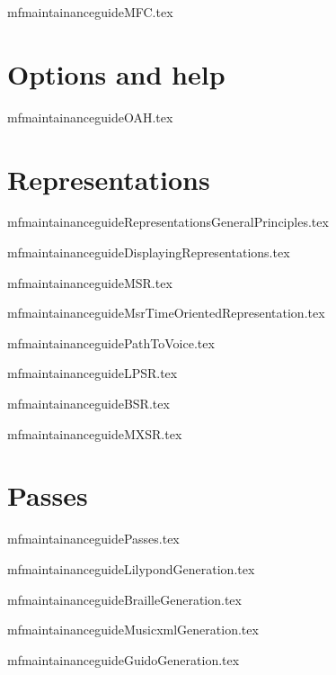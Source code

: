 \documentclass[11pt,a4paper]{report}
\begin{document}
{mfmaintainanceguideMFC.tex}


\part{Options and help}

{mfmaintainanceguideOAH.tex}


\part{Representations}

{mfmaintainanceguideRepresentationsGeneralPrinciples.tex}

{mfmaintainanceguideDisplayingRepresentations.tex}

{mfmaintainanceguideMSR.tex}

{mfmaintainanceguideMsrTimeOrientedRepresentation.tex}

{mfmaintainanceguidePathToVoice.tex}

{mfmaintainanceguideLPSR.tex}

{mfmaintainanceguideBSR.tex}

{mfmaintainanceguideMXSR.tex}


\part{Passes}

{mfmaintainanceguidePasses.tex}

{mfmaintainanceguideLilypondGeneration.tex}

{mfmaintainanceguideBrailleGeneration.tex}

{mfmaintainanceguideMusicxmlGeneration.tex}

{mfmaintainanceguideGuidoGeneration.tex}


\end{document}
